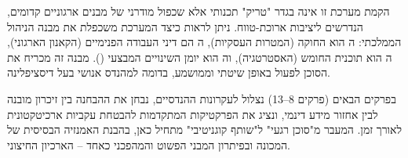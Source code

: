 הקמת מערכת זו אינה בגדר "טריק" תכנותי אלא שכפול מודרני של מבנים ארגוניים קדומים, הנדרשים ליציבות ארוכת-טווח. ניתן לראות כיצד המערכת משכפלת את מבנה הניהול הממלכתי: ה הוא החוקה (המטרות העסקיות), ה הם דיני העבודה הפנימיים (הקאנון הארגוני), ה הוא תוכנית החומש (האסטרטגיה), וה הוא יומן השינויים המבצעי (). מבנה זה מכריח את הסוכן לפעול באופן שיטתי וממושמע, בדומה למהנדס אנושי בעל דיסציפלינה.

בפרקים הבאים (פרקים \num{8}–\num{13}) נצלול לעקרונות ההנדסיים, נבחן את ההבחנה בין זיכרון מובנה לבין אחזור מידע דינמי, ונציג את הפרקטיקות המתקדמות להבטחת עקביות ארכיטקטונית לאורך זמן. המעבר מ"סוכן רגעי" ל"שותף קוגניטיבי" מתחיל כאן, בהבנת האמנזיה הבסיסית של המכונה ובפיתרון המבני הפשוט והמהפכני כאחד – הארכיון החיצוני.

